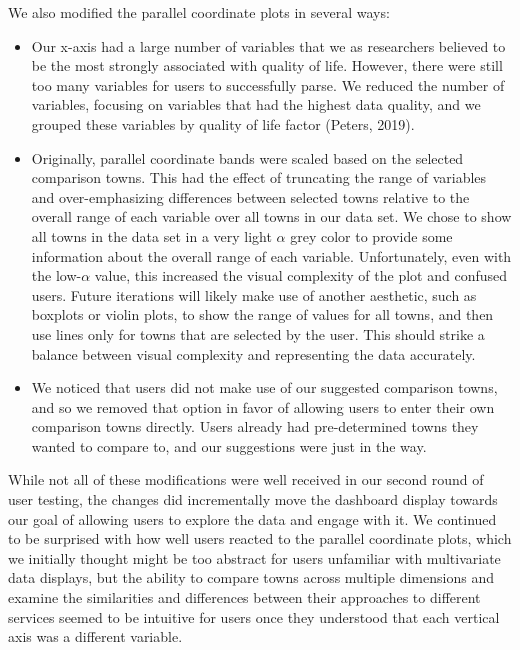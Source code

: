 \documentclass[print]{nuthesis}
\providecommand{\tightlist}{%
  \setlength{\itemsep}{0pt}\setlength{\parskip}{0pt}}
\begin{document}
We also modified the parallel coordinate plots in several ways:

\begin{itemize}
\tightlist
\item
  Our x-axis had a large number of variables that we as researchers believed to be the most strongly associated with quality of life. However, there were still too many variables for users to successfully parse. We reduced the number of variables, focusing on variables that had the highest data quality, and we grouped these variables by quality of life factor (Peters, 2019).
\item
  Originally, parallel coordinate bands were scaled based on the selected comparison towns. This had the effect of truncating the range of variables and over-emphasizing differences between selected towns relative to the overall range of each variable over all towns in our data set. We chose to show all towns in the data set in a very light \(\alpha\) grey color to provide some information about the overall range of each variable. Unfortunately, even with the low-\(\alpha\) value, this increased the visual complexity of the plot and confused users. Future iterations will likely make use of another aesthetic, such as boxplots or violin plots, to show the range of values for all towns, and then use lines only for towns that are selected by the user. This should strike a balance between visual complexity and representing the data accurately.
\item
  We noticed that users did not make use of our suggested comparison towns, and so we removed that option in favor of allowing users to enter their own comparison towns directly. Users already had pre-determined towns they wanted to compare to, and our suggestions were just in the way.
\end{itemize}

While not all of these modifications were well received in our second round of user testing, the changes did incrementally move the dashboard display towards our goal of allowing users to explore the data and engage with it. We continued to be surprised with how well users reacted to the parallel coordinate plots, which we initially thought might be too abstract for users unfamiliar with multivariate data displays, but the ability to compare towns across multiple dimensions and examine the similarities and differences between their approaches to different services seemed to be intuitive for users once they understood that each vertical axis was a different variable.
\end{document}
